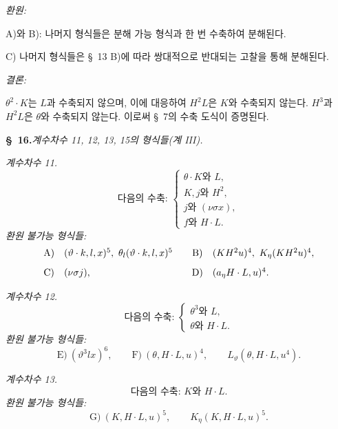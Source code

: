 \noindent\emph{환원:}

A)와 B): 나머지 형식들은 분해 가능 형식과 한 번 수축하여 분해된다.

C) 나머지 형식들은 \S\ 13 B)에 따라 쌍대적으로 반대되는 고찰을 통해 분해된다.

\noindent\emph{결론:}

$\theta^2\cdot K$는 $L$과 수축되지 않으며, 이에 대응하여 $H^2L$은 $K$와 수축되지 않는다. $H^3$과 $H^2L$은 $\theta$와 수축되지 않는다. 이로써 \S\ 7의 수축 도식이 증명된다.

\begin{center}
\textbf{\S\ 16.}\quad\emph{계수차수 11, 12, 13, 15의 형식들(계 III).}
\end{center}

\noindent\emph{계수차수 11.}
\[
\text{다음의 수축: }\left\{\begin{array}{l}
\theta\cdot K\text{와 }L,\\
K,j\text{와 }H^2,\\
j\text{와 }(\nu\sigma x),\\
f\text{와 }H\cdot L.
\end{array}\right.
\]
\noindent\emph{환원 불가능 형식들:}
\[
\begin{array}{c@{\quad}l@{\qquad}c@{\quad}l}
\text{A)}&(\vartheta\cdot k,l,x)^5,
\ \theta_l(\vartheta\cdot k,l,x)^5&
\text{B)}&(KH^2u)^4,
\ K_\eta(KH^2u)^4,\\[0.8em]
\text{C)}&(\nu\sigma j),&
\text{D)}&(a_\eta H\cdot L,u)^4.
\end{array}
\]

\noindent\emph{계수차수 12.}
\[
\text{다음의 수축: }\left\{\begin{array}{l}
\theta^3\text{와 }L,\\
\theta\text{와 }H\cdot L.
\end{array}\right.
\]
\noindent\emph{환원 불가능 형식들:}
\[
\text{E)}\ (\vartheta^3lx)^6,
\qquad
\text{F)}\ (\theta,H\cdot L,u)^4,
\qquad L_\vartheta(\theta,H\cdot L,u^4).
\]

\noindent\emph{계수차수 13.}
\[
\text{다음의 수축: }K\text{와 }H\cdot L.
\]
\noindent\emph{환원 불가능 형식들:}
\[
\text{G)}\ (K,H\cdot L,u)^5,
\qquad K_\eta(K,H\cdot L,u)^5.
\]

